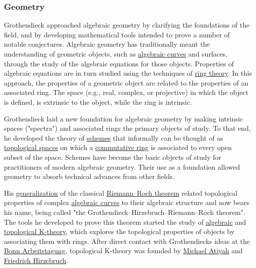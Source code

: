 \subsubsection{Geometry}\label{Geometry}

Grothendieck approached algebraic geometry by clarifying the foundations of the field, and by developing mathematical tools intended to prove a number of notable conjectures. Algebraic geometry has traditionally meant the understanding of geometric objects, such as \href{https://en.wikipedia.org/wiki/Algebraic_curve}{algebraic curves} and surfaces, through the study of the algebraic equations for those objects. Properties of algebraic equations are in turn studied using the techniques of \href{https://en.wikipedia.org/wiki/Ring_theory}{ring theory}. In this approach, the properties of a geometric object are related to the properties of an associated ring. The space (e.g., real, complex, or projective) in which the object is defined, is extrinsic to the object, while the ring is intrinsic.

Grothendieck laid a new foundation for algebraic geometry by making intrinsic spaces ("spectra") and associated rings the primary objects of study. To that end, he developed the theory of \href{https://en.wikipedia.org/wiki/Scheme_(mathematics)}{schemes} that informally can be thought of as \href{https://en.wikipedia.org/wiki/Topological_space}{topological spaces} on which a \href{https://en.wikipedia.org/wiki/Commutative_ring}{commutative ring} is associated to every open subset of the space. Schemes have become the basic objects of study for practitioners of modern algebraic geometry. Their use as a foundation allowed geometry to absorb technical advances from other fields.

His \href{https://en.wikipedia.org/wiki/Grothendieck–Hirzebruch–Riemann–Roch_theorem}{generalization} of the classical \href{https://en.wikipedia.org/wiki/Riemann–Roch_theorem}{Riemann--Roch theorem} related topological properties of complex \href{https://en.wikipedia.org/wiki/Algebraic_curve}{algebraic curves} to their algebraic structure and now bears his name, being called "the Grothendieck--Hirzebruch--Riemann--Roch theorem". The tools he developed to prove this theorem started the study of \href{https://en.wikipedia.org/wiki/Algebraic_K-theory}{algebraic} and \href{https://en.wikipedia.org/wiki/Topological_K-theory}{topological K-theory}, which explores the topological properties of objects by associating them with rings. After direct contact with Grothendieck\textquotesingle s ideas at the \href{https://en.wikipedia.org/wiki/Bonn_Arbeitstagung}{Bonn Arbeitstagung}, topological K-theory was founded by \href{https://en.wikipedia.org/wiki/Michael_Atiyah}{Michael Atiyah} and \href{https://en.wikipedia.org/wiki/Friedrich_Hirzebruch}{Friedrich Hirzebruch}.


